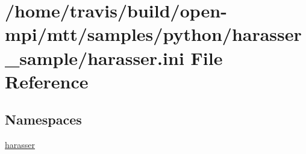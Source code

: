 \hypertarget{harasser_8ini}{\section{/home/travis/build/open-\/mpi/mtt/samples/python/harasser\-\_\-sample/harasser.ini File Reference}
\label{harasser_8ini}
}
\subsection*{Namespaces}
\begin{DoxyCompactItemize}
\item 
\hyperlink{namespaceharasser}{harasser}
\end{DoxyCompactItemize}
